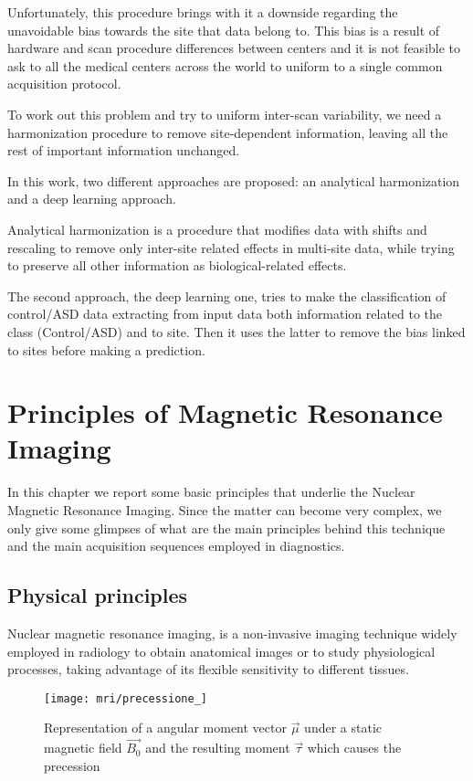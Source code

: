 \documentclass[11pt]{report}
\begin{document}
Unfortunately, this procedure brings with it a downside regarding the unavoidable bias towards the site that data belong to.
This bias is a result of hardware and scan procedure differences between centers and it is not feasible to ask to all the medical centers across the world to uniform to a single common acquisition protocol.

To work out this problem and try to uniform inter-scan variability, we need a harmonization procedure to remove site-dependent information, leaving all the rest of important information unchanged.

In this work, two different approaches are proposed: an analytical harmonization and a deep learning approach.

Analytical harmonization is a procedure that modifies data with shifts and rescaling to remove only inter-site related effects in multi-site data, while trying to preserve all other information as biological-related effects.

The second approach, the deep learning one, tries to make the classification of control/ASD data extracting from input data both information related to the class (Control/ASD) and to site.
Then it uses the latter to remove the bias linked to sites before making a prediction.


\chapter{Principles of Magnetic Resonance Imaging}\label{chap:mri_introduction}
 In this chapter we report some basic principles that underlie the Nuclear Magnetic Resonance Imaging.
 Since the matter can become very complex, we only give some glimpses of what are the main principles behind this technique and the main acquisition sequences employed in diagnostics.

\section{Physical principles}\label{sec:mri_introduction}
Nuclear magnetic resonance imaging, is a non-invasive imaging technique widely employed in radiology to obtain anatomical images or to study physiological processes, taking advantage of its flexible sensitivity to different tissues.

\begin{wrapfigure}[25]{l}{0.4\textwidth}
\centering
\texttt{[image: mri/precessione\_]}
\caption{Representation of a angular moment vector $\vec{\mu}$ under a static magnetic field $\vec{B_0}$ and the resulting moment $\vec{\tau}$  which causes the precession}
\label{fig:precession}
\end{wrapfigure}
\end{document}
